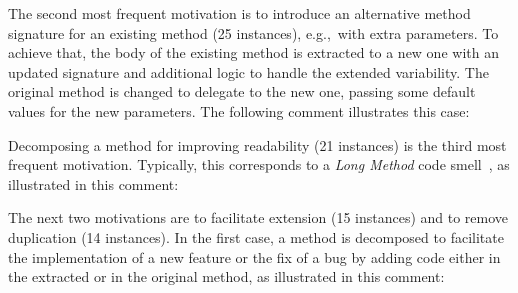 \margin


\margin



The second most frequent motivation is to introduce an alternative method signature for an existing method
 (25 instances), e.g.,~with extra parameters.
To achieve that, the body of the existing method is extracted to a 
new one with an updated signature and additional logic to handle the extended variability.
The original  method is changed to delegate to the new one, passing some default values for the new parameters.
The following comment illustrates this case:\margin

\margin


Decomposing a method for improving readability (21 instances) is the third most frequent motivation. Typically, 
this corresponds to a {\em Long Method} code smell~\citep{Fowler:1999}, as illustrated in this comment:\margin

\margin


The next two motivations are to facilitate extension (15 instances) and to remove duplication (14 instances).
In the first case, a method is decomposed to facilitate the implementation of a new feature or the fix of a bug by adding code either in the extracted or in the 
original method, as illustrated in this comment:\margin

